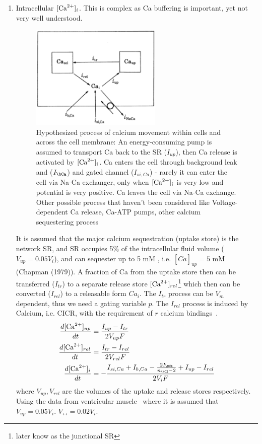 \begin{enumerate}
\item Intracellular $[{\text{Ca}^{2+}}]_i$.  This is complex as Ca buffering is
  important, yet not very well understood. 
\begin{figure}[hbt]
  \centerline{\includegraphics[height=5cm,
    angle=0]{./images/DN_calcium_sequest.eps}}
  \caption{Hypothesized process of calcium movement within cells and
    across the cell membrane: An energy-consuming pump is assumed to
    transport Ca back to the SR ($I_{up}$), then Ca release is
    activated by $[{\text{Ca}^{2+}}]_i$. Ca enters the cell through background leak
    and ($I_\bCa$) and gated channel ($I_{si,Ca}$) - rarely it can
    enter the cell via Na-Ca exchanger, only when $[{\text{Ca}^{2+}}]_i$ is very low
    and potential is very positive. Ca leaves the cell via Na-Ca
    exchange. Other possible process that haven't been considered like
    Voltage-dependent Ca release, Ca-ATP pumps, other calcium
    sequestering process}
\label{fig:DN_calcium}
\end{figure}

It is assumed that the major calcium sequestration (uptake store) is
the network SR, and SR occupies 5\% of the intracellular fluid volume
($V_{up}=0.05V_i$), and can sequester up to 5 mM ,
i.e. $[\overline{Ca}]_{up}=5$ mM (Chapman (1979)). A fraction of Ca from
the uptake store then can be transferred ($I_{tr}$) to a separate
release store $[{\text{Ca}^{2+}}]_{rel}$\footnote{later know as the junctional SR}
which then can be converted ($I_{rel}$) to a releasable form
$Ca_{i}$. The $I_{tr}$ process can be $V_m$ dependent, thus we need a
gating variable $p$. The $I_{rel}$ process is induced by Calcium,
i.e. CICR, with the requirement of $r$ calcium
bindings~\citep{fabiato1975cic}.
\begin{equation}
  \label{eq:737}
  \begin{split}
    \frac{d[\Ca]_{up}}{dt} &= \frac{I_{up}-I_{tr}}{2V_{up}F} \\
\frac{d[\Ca]_{rel}}{dt} &= \frac{I_{tr}-I_{rel}}{2V_{rel}F} \\
\frac{d[\Ca]_i}{dt} &= -\frac{I_{si,Ca}+I_{b,Ca} -
  \frac{2I_\NCX}{n_\NCX-2} + I_{up} - I_{rel}}{2V_iF}
  \end{split}
\end{equation}
where $V_{up}, V_{rel}$ are the volumes of the uptake and release
stores respectively. Using the data from ventricular
muscle~\citep{chapman1979} where it is assumed that
$V_{up}=0.05V_i$. $V_\rel=0.02V_i$. 


\end{enumerate}
